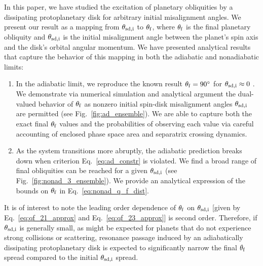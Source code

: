 \documentclass[
        fleqn,
        usenatbib,
    ]{mnras}
\begin{document}
In this paper, we have studied the excitation of planetary obliquities by a
dissipating protoplanetary disk for arbitrary initial misalignment angles. We
present our result as a mapping from $\theta_{\rm sd, i}$ to $\theta_{\rm f}$,
where $\theta_{\rm f}$ is the final planetary obliquity and $\theta_{\rm sd, i}$
is the initial misalignment angle between the planet's spin axis and the disk's
orbital angular momentum. We have presented analytical results that capture the
behavior of this mapping in both the adiabatic and nonadiabatic limits:
\begin{enumerate}
    \item In the adiabatic limit, we reproduce the known result $\theta_{\rm f}
        = 90^\circ$ for $\theta_{\rm sd, i} \approx 0$ \citep{millholland_disk}.
        We demonstrate via numerical simulation and analytical argument the
        dual-valued behavior of $\theta_{\rm f}$ as nonzero initial spin-disk
        misalignment angles $\theta_{\rm sd, i}$ are permitted (see
        Fig.~\ref{fig:ad_ensemble}). We are able to capture both the exact final
        $\theta_{\rm f}$ values and the probabilities of observing each value
        via careful accounting of enclosed phase space area and separatrix
        crossing dynamics.

    \item As the system transitions more abruptly, the adiabatic prediction
        breaks down when criterion Eq.~\eqref{eq:ad_constr} is violated. We find
        a broad range of final obliquities can be reached for a given
        $\theta_{\rm sd, i}$ (see Fig.~\ref{fig:nonad_3_ensemble}). We provide
        an analytical expression of the bounds on $\theta_{\rm f}$ in
        Eq.~\eqref{eq:nonad_q_f_dist}.
\end{enumerate}

It is of interest to note the leading order dependence of $\theta_{\rm f}$ on
$\theta_{\rm sd, i}$ [given by Eq.~\eqref{eq:qf_21_approx} and
Eq.~\eqref{eq:qf_23_approx}] is second order. Therefore, if $\theta_{\rm sd, i}$
is generally small, as might be expected for planets that do not experience
strong collisions or scattering, resonance passage induced by an adiabatically
dissipating protoplanetary disk is expected to significantly narrow the final
$\theta_{\rm f}$ spread compared to the initial $\theta_{\rm sd, i}$ spread.




\appendix
\end{document}
